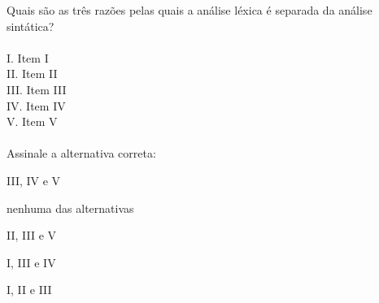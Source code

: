 \question[10]

Quais são as três razões pelas quais a análise léxica é separada da análise sintática?\\
\\
I. Item I\\
II. Item II\\
III. Item III\\
IV. Item IV\\
V. Item V\\
\\
Assinale a alternativa correta:
\begin{choices}
\item III, IV e V
\item nenhuma das alternativas
\item II, III e V %
\item I, III e IV
\item I, II e III
\end{choices}
\answerline

